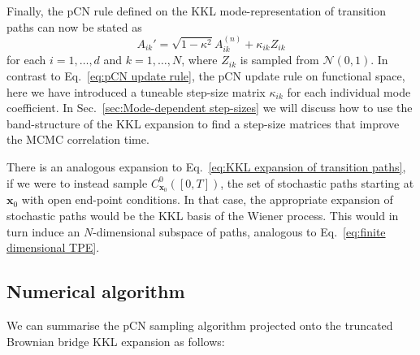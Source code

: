Finally, the pCN rule defined on the KKL mode-representation of transition paths can now be stated as
		\begin{equation}
			A_{ik}' = \sqrt{1 - \kappa^2} A_{ik}^{(n)} + \kappa_{ik} Z_{ik}
		\end{equation}
for each $i=1,\dots,d$ and $k = 1,\dots,N$, where $Z_{ik}$ is sampled from $\mathcal{N}(0,1)$. In contrast to Eq.~\ref{eq:pCN update rule}, the pCN update rule on functional space, here we have introduced a tuneable step-size matrix $\kappa_{ik}$ for each individual mode coefficient. In Sec.~\ref{sec:Mode-dependent step-sizes} we will discuss how to use the band-structure of the KKL expansion to find a step-size matrices that improve the MCMC correlation time.  %

There is an analogous expansion to Eq.~\ref{eq:KKL expansion of transition paths}, if we were to instead sample $C_{\mathbf{x}_0}^0([0,T])$, the set of stochastic paths starting at $\mathbf{x}_0$ with open end-point conditions. In that case, the appropriate expansion of stochastic paths would be the KKL basis of the Wiener process. This would in turn induce an $N$-dimensional subspace of paths, analogous to Eq.~\ref{eq:finite dimensional TPE}.

\subsection{Numerical algorithm} \label{sec:pCN Numerical algorithm summary}
We can summarise the pCN sampling algorithm projected onto the truncated Brownian bridge KKL expansion as follows:

